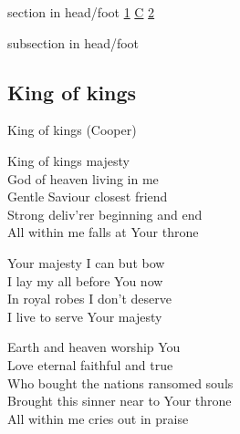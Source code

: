 \documentclass{beamer}
\begin{document}
{
{ 
 {
 \begin{beamercolorbox}[ht=4.5ex,dp=1.5ex,%
      leftskip=.3cm,rightskip=.3cm plus1fil]{section in head/foot}
 \fontsize{12}{25}\selectfont 
\hyperlink{King of kings[](Cooper)1}{1}
\hyperlink{King of kings[](Cooper)C}{C}
\hyperlink{King of kings[](Cooper)2}{2}
 
 \end{beamercolorbox}%
  \begin{beamercolorbox}[ht=2.5ex,dp=1.125ex,%
   leftskip=.3cm,rightskip=.3cm plus1fil]{subsection in head/foot}
   \insertauthor
 \end{beamercolorbox}%
 }
}
\subsection{ King of kings }

\hypertarget{King of kings[](Cooper)1}{}
\begin{frame}{King of kings (Cooper)}
\fontsize{ 18 }{ 23 }\selectfont

King of kings majesty\\ 
God of heaven living in me\\ 
Gentle Saviour closest friend\\ 
Strong deliv'rer beginning and end\\ 
All within me falls at Your throne 

\end{frame}

\hypertarget{King of kings[](Cooper)C}{}
\begin{frame}{}
\fontsize{ 18 }{ 23 }\selectfont

Your majesty I can but bow\\ 
I lay my all before You now\\ 
In royal robes I don't deserve\\ 
I live to serve Your majesty 

\end{frame}

\hypertarget{King of kings[](Cooper)2}{}
\begin{frame}{}
\fontsize{ 18 }{ 23 }\selectfont

Earth and heaven worship You\\ 
Love eternal faithful and true\\ 
Who bought the nations ransomed souls\\ 
Brought this sinner near to Your throne\\ 
All within me cries out in praise 

\end{frame}

}
\end{document}
